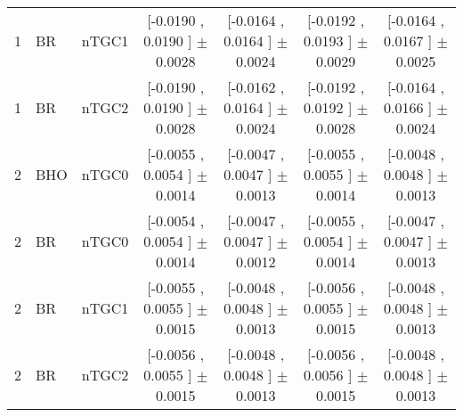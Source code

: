 \begin{landscape}
\begin{table}[htbp]
\begin{tabular}{lllcccc}
  1 &   BR &  nTGC1 &  [-0.0190 , 0.0190 ] $\pm$ 0.0028 &  [-0.0164 , 0.0164 ] $\pm$ 0.0024 &  [-0.0192 , 0.0193 ] $\pm$ 0.0029 &  [-0.0164 , 0.0167 ] $\pm$ 0.0025 \\
  1 &   BR &  nTGC2 &  [-0.0190 , 0.0190 ] $\pm$ 0.0028 &  [-0.0162 , 0.0164 ] $\pm$ 0.0024 &  [-0.0192 , 0.0192 ] $\pm$ 0.0028 &  [-0.0164 , 0.0166 ] $\pm$ 0.0024 \\
  2 &  BHO &  nTGC0 &  [-0.0055 , 0.0054 ] $\pm$ 0.0014 &  [-0.0047 , 0.0047 ] $\pm$ 0.0013 &  [-0.0055 , 0.0055 ] $\pm$ 0.0014 &  [-0.0048 , 0.0048 ] $\pm$ 0.0013 \\
  2 &   BR &  nTGC0 &  [-0.0054 , 0.0054 ] $\pm$ 0.0014 &  [-0.0047 , 0.0047 ] $\pm$ 0.0012 &  [-0.0055 , 0.0054 ] $\pm$ 0.0014 &  [-0.0047 , 0.0047 ] $\pm$ 0.0013 \\
  2 &   BR &  nTGC1 &  [-0.0055 , 0.0055 ] $\pm$ 0.0015 &  [-0.0048 , 0.0048 ] $\pm$ 0.0013 &  [-0.0056 , 0.0055 ] $\pm$ 0.0015 &  [-0.0048 , 0.0048 ] $\pm$ 0.0013 \\
  2 &   BR &  nTGC2 &  [-0.0056 , 0.0055 ] $\pm$ 0.0015 &  [-0.0048 , 0.0048 ] $\pm$ 0.0013 &  [-0.0056 , 0.0056 ] $\pm$ 0.0015 &  [-0.0048 , 0.0048 ] $\pm$ 0.0013 \\

\hline
\hline\hline
\end{tabular}
\end{table}
 \end{landscape}

